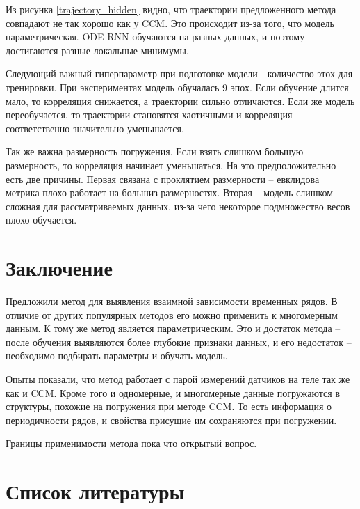 \documentclass[12pt, twoside]{article}
\begin{document}
Из рисунка \ref{trajectory_hidden} видно, что траектории предложенного метода совпадают не так хорошо как у CCM. Это происходит из-за того, что модель параметрическая. ODE-RNN обучаются на разных данных, и поэтому достигаются разные локальные минимумы. 

Следующий важный гиперпараметр при подготовке модели - количество этох для тренировки. При экспериментах модель обучалась 9 эпох. Если обучение длится мало, то корреляция снижается, а траектории сильно отличаются. Если же модель переобучается, то траектории становятся хаотичными и корреляция соответственно значительно уменьшается.

Так же важна размерность погружения. Если взять слишком большую размерность, то корреляция начинает уменьшаться. На это предположительно есть две причины. Первая связана с проклятием размерности -- евклидова метрика плохо работает на большиз размерностях. Вторая -- модель слишком сложная для рассматриваемых данных, из-за чего некоторое подмножество весов плохо обучается.

\section{Заключение}

Предложили метод для выявления взаимной зависимости временных рядов.  В отличие от других популярных методов его можно применить к многомерным данным. К тому же метод является параметрическим. Это и достаток метода -- после обучения выявляются более глубокие признаки данных, и его недостаток -- необходимо подбирать параметры и обучать модель.

   Опыты показали, что метод работает с парой измерений датчиков на теле так же как и CCM. Кроме того и одномерные, и многомерные данные погружаются в структуры, похожие на погружения при методе CCM. То есть информация о периодичности рядов, и свойства присущие им сохраняются при погружении.
   
   Границы применимости метода пока что открытый вопрос.


\section{Список литературы}




\newpage
\end{document}
